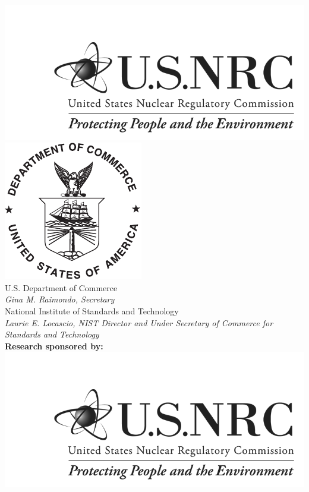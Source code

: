 \begin{titlepage}
\begin{flushright}
\includegraphics[width=0.4\linewidth]{../FIGURES/NRC_logo}  \hspace{0.5in}
\includegraphics[width=0.2\linewidth]{../FIGURES/DoC-logo.pdf}\\
\vfill
\footnotesize U.S. Department of Commerce\\
\textit{Gina M. Raimondo, Secretary}\\
\vspace{10pt}
National Institute of Standards and Technology\\
\hspace*{-3cm}\textit{Laurie E. Locascio, NIST Director and Under Secretary of Commerce for Standards and Technology} \\
\vspace{10pt}
\normalsize
\textbf{Research sponsored by:} \\
\includegraphics[width=0.4\linewidth]{../FIGURES/NRC_logo.png}
\end{flushright}
\end{titlepage}

